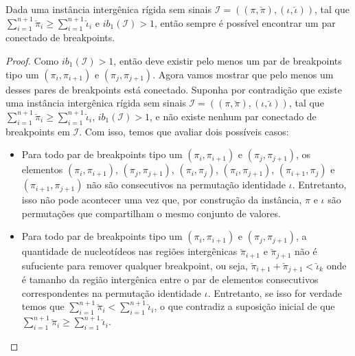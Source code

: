 \begin{lemma}\label{lemma:WYEZMYTM}
Dada uma instância intergênica rígida sem sinais $\mathcal{I}=((\pi,\breve\pi),(\iota,\breve\iota))$, tal que $\sum_{i=1}^{n+1}\breve\pi_i \ge \sum_{i=1}^{n+1}\breve\iota_i$ e $ib_1(\mathcal{I}) > 1$, então sempre é possível encontrar um par conectado de breakpoints.
\end{lemma}
\begin{proof}
Como $ib_1(\mathcal{I}) > 1$, então deve existir pelo menos um par de breakpoints tipo um $(\pi_i,\pi_{i+1})$ e $(\pi_j,\pi_{j+1})$. Agora vamos mostrar que pelo menos um desses pares de breakpoints está conectado. Suponha por contradição que existe uma instância intergênica rígida sem sinais $\mathcal{I}=((\pi,\breve\pi),(\iota,\breve\iota))$, tal que $\sum_{i=1}^{n+1}\breve\pi_i \ge \sum_{i=1}^{n+1}\breve\iota_i$, $ib_1(\mathcal{I}) > 1$, e não existe nenhum par conectado de breakpoints em $\mathcal{I}$. Com isso, temos que avaliar dois possíveis casos:
\begin{itemize}
  \item Para todo par de breakpoints tipo um $(\pi_i,\pi_{i+1})$ e $(\pi_j,\pi_{j+1})$, os elementos $(\pi_i,\pi_{i+1})$, $(\pi_j,\pi_{j+1})$, $(\pi_i,\pi_{j})$, $(\pi_i,\pi_{j+1})$, $(\pi_{i+1},\pi_{j})$ e $(\pi_{i+1},\pi_{j+1})$ não são consecutivos na permutação identidade $\iota$. Entretanto, isso não pode acontecer uma vez que, por construção da instância, $\pi$ e $\iota$ são permutações que compartilham o mesmo conjunto de valores.
  \item Para todo par de breakpoints tipo um $(\pi_i,\pi_{i+1})$ e $(\pi_j,\pi_{j+1})$, a quantidade de nucleotídeos nas regiões intergênicas $\breve\pi_{i+1}$ e $\breve\pi_{j+1}$ não é sufuciente para remover qualquer breakpoint, ou seja, $\breve\pi_{i+1} + \breve\pi_{j+1} < \breve\iota_k$ onde é tamanho da região intergênica entre o par de elementos consecutivos correspondentes na permutação identidade $\iota$. Entretanto, se isso for verdade temos que $\sum_{i=1}^{n+1}\breve\pi_i < \sum_{i=1}^{n+1}\breve\iota_i$, o que contradiz a suposição inicial de que $\sum_{i=1}^{n+1}\breve\pi_i \ge \sum_{i=1}^{n+1}\breve\iota_i$.
\end{itemize}
\end{proof}

